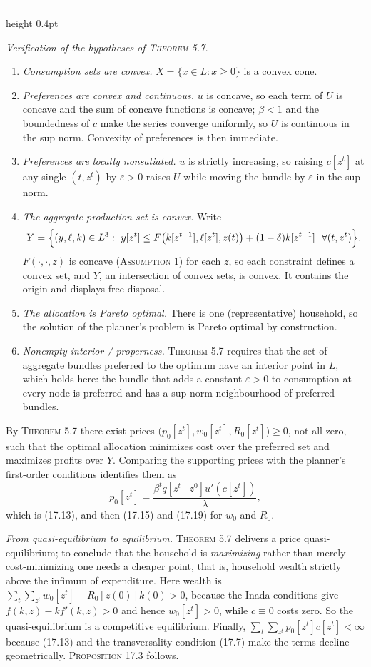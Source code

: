 \documentclass[11pt,letterpaper,reqno]{amsart}
\makeatletter
\newcommand{\as@head}[3]{%
  \par\addvspace{1.6ex}\penalty-200\relax
  \phantomsection
  \addcontentsline{toc}{subsection}{#1 #2\texorpdfstring{\ifx\relax#3\relax\else\quad #3\fi}{}}%
  {\color{RuleGrey}\hrule height 0.4pt}%
  \nobreak\vspace{0.8ex}\nobreak
  \noindent{\bfseries #1 #2}%
  \ifx\relax#3\relax\else\quad{\bfseries\itshape #3}\fi
  \par\nobreak\vspace{0.4ex}\nobreak
  \as@beginstatement
}
\newcommand{\as@beginstatement}{\begingroup\itshape\ignorespaces}
\newenvironment{aex}[2]{\as@head{Exercise}{#1}{#2}}{\par\addvspace{1.2ex}}
\newcommand{\bk}[1]{\textup{\textsc{#1}}}
\renewcommand{\as@beginstatement}{\ignorespaces}
\makeatother
\begin{document}
\begin{aex}{17.9}{}
\emph{Verification of the hypotheses of \bk{Theorem 5.7}.}
\begin{enumerate}
\item \emph{Consumption sets are convex.}  $X=\{x\in L: x\ge0\}$ is a convex cone.
\item \emph{Preferences are convex and continuous.}  $u$ is concave, so each term of $U$ is
      concave and the sum of concave functions is concave; $\beta<1$ and the boundedness of $c$
      make the series converge uniformly, so $U$ is continuous in the sup norm.  Convexity of
      preferences is then immediate.
\item \emph{Preferences are locally nonsatiated.}  $u$ is strictly increasing, so raising
      $c[z^t]$ at any single $(t,z^t)$ by $\varepsilon>0$ raises $U$ while moving the bundle by
      $\varepsilon$ in the sup norm.
\item \emph{The aggregate production set is convex.}  Write
      \[
      Y=\Bigl\{(y,\ell,k)\in L^3:\ y[z^t]\le F\bigl(k[z^{t-1}],\ell[z^t],z(t)\bigr)
      +(1-\delta)k[z^{t-1}]\ \ \forall (t,z^t)\Bigr\} .
      \]
      $F(\cdot,\cdot,z)$ is concave (\bk{Assumption 1}) for each $z$, so each constraint defines
      a convex set, and $Y$, an intersection of convex sets, is convex.  It contains the origin
      and displays free disposal.
\item \emph{The allocation is Pareto optimal.}  There is one (representative) household, so the
      solution of the planner's problem is Pareto optimal by construction.
\item \emph{Nonempty interior / properness.}  \bk{Theorem 5.7} requires that the set of
      aggregate bundles preferred to the optimum have an interior point in $L$, which holds
      here: the bundle that adds a constant $\varepsilon>0$ to consumption at every node is
      preferred and has a sup-norm neighbourhood of preferred bundles.
\end{enumerate}
By \bk{Theorem 5.7} there exist prices $\bigl(p_0[z^t],w_0[z^t],R_0[z^t]\bigr)\ge0$, not all
zero, such that the optimal allocation minimizes cost over the preferred set and maximizes
profits over $Y$.  Comparing the supporting prices with the planner's first-order conditions
identifies them as
\[
p_0[z^t]=\frac{\beta^tq[z^t\mid z^0]u'(c[z^t])}{\lambda},
\]
which is \bk{(17.13)}, and then \bk{(17.15)} and \bk{(17.19)} for $w_0$ and $R_0$.

\emph{From quasi-equilibrium to equilibrium.}  \bk{Theorem 5.7} delivers a price
quasi-equilibrium; to conclude that the household is \emph{maximizing} rather than merely
cost-minimizing one needs a cheaper point, that is, household wealth strictly above the
infimum of expenditure.  Here wealth is
$\sum_t\sum_{z^t}w_0[z^t]+R_0[z(0)]k(0)>0$, because the Inada conditions give
$f(k,z)-kf'(k,z)>0$ and hence $w_0[z^t]>0$, while $c\equiv0$ costs zero.  So the quasi-equilibrium
is a competitive equilibrium.  Finally, $\sum_t\sum_{z^t}p_0[z^t]c[z^t]<\infty$ because
\bk{(17.13)} and the transversality condition \bk{(17.7)} make the terms decline
geometrically.  \bk{Proposition 17.3} follows.
\end{aex}
\end{document}
